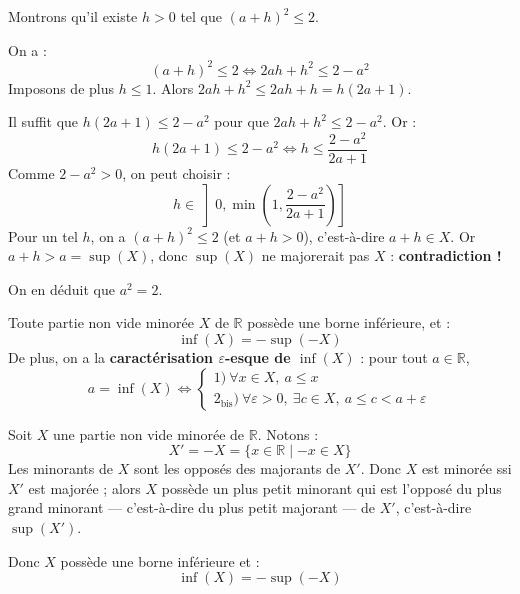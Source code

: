\documentclass[a4paper,11pt]{article}
\newcommand{\R}{\mathbb{R}}
\newcommand{\mot}[1]{\textcolor{bordeaux}{\textbf{#1}}}
\begin{document}
\begin{exemples}[Existence de $\sqrt{2} \in \R$]
\begin{enumerate}
    Montrons qu'il existe $h > 0$ tel que $(a + h)^2 \le 2$.
    
    On a :
    \[
    (a + h)^2 \le 2 \iff 2ah + h^2 \le 2 - a^2
    \]
    Imposons de plus $h \le 1$. Alors $2ah + h^2 \le 2ah + h = h(2a + 1)$.
    
    Il suffit que $h(2a + 1) \le 2 - a^2$ pour que $2ah + h^2 \le 2 - a^2$. Or :
    \[
    h(2a + 1) \le 2 - a^2 \iff h \le \frac{2 - a^2}{2a + 1}
    \]
    Comme $2 - a^2 > 0$, on peut choisir :
    \[
    h \in \left] 0, \min\left(1, \frac{2 - a^2}{2a + 1}\right) \right]
    \]
    Pour un tel $h$, on a $(a + h)^2 \le 2$ (et $a + h > 0$), c'est-à-dire $a + h \in X$. Or $a + h > a = \sup(X)$, donc $\sup(X)$ ne majorerait pas $X$ : \textbf{contradiction !}
\end{enumerate}
On en déduit que $a^2 = 2$.
\end{exemples}

\begin{proposition}
Toute partie non vide minorée $X$ de $\R$ possède une borne inférieure, et :
\[
\inf(X) = -\sup(-X)
\]
De plus, on a la \mot{caractérisation $\varepsilon$-esque de $\inf(X)$} : pour tout $a \in \R$,
\[
a = \inf(X) \iff
\begin{cases}
1)\ \forall x \in X, \ a \le x \\[4pt]
2_{\text{bis}})\ \forall \varepsilon > 0, \ \exists c \in X, \ a \le c < a + \varepsilon
\end{cases}
\]
\end{proposition}

\begin{center}
\end{center}

\begin{demonstration}
Soit $X$ une partie non vide minorée de $\R$. Notons :
\[
X' = -X = \{ x \in \R \mid -x \in X \}
\]
Les minorants de $X$ sont les opposés des majorants de $X'$. Donc $X$ est minorée ssi $X'$ est majorée ; alors $X$ possède un plus petit minorant qui est l'opposé du plus grand minorant — c'est-à-dire du plus petit majorant — de $X'$, c'est-à-dire $\sup(X')$.

Donc $X$ possède une borne inférieure et :
\[
\inf(X) = -\sup(-X)
\]
\end{demonstration}
\end{document}
